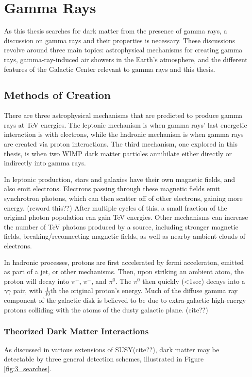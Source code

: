 \cleartooddpage[\thispagestyle{empty}]
\chapter{Gamma Rays}

As this thesis searches for dark matter from the presence of gamma rays, a discussion on gamma rays and their properties is necessary.
These discussions revolve around three main topics: astrophysical mechanisms for creating gamma rays, gamma-ray-induced air showers in the Earth's atmosphere, and the different features of the Galactic Center relevant to gamma rays and this thesis.


\section{Methods of Creation}

There are three astrophysical mechanisms that are predicted to produce gamma rays at TeV energies.
The leptonic mechanism is when gamma rays' last energetic interaction is with electrons, while the hadronic mechanism is when gamma rays are created via proton interactions.
The third mechanism, one explored in this thesis, is when two WIMP dark matter particles annihilate either directly or indirectly into gamma rays.

In leptonic production, stars and galaxies have their own magnetic fields, and also emit electrons.
Electrons passing through these magnetic fields emit synchrotron photons, which can then scatter off of other electrons, gaining more energy. {\color{red}(reword this??)}
After multiple cycles of this, a small fraction of the original photon population can gain TeV energies.
Other mechanisms can increase the number of TeV photons produced by a source, including stronger magnetic fields, breaking/reconnecting magnetic fields, as well as nearby ambient clouds of electrons.

In hadronic processes, protons are first accelerated by fermi acceleraton, emitted as part of a jet, or other mechanisms.
Then, upon striking an ambient atom, the proton will decay into $\pi^{+}$, $\pi^{-}$, and $\pi^{0}$.
The $\pi^{0}$ then quickly (<1sec) decays into a $\gamma\gamma$ pair, with \nicetilde $\frac{1}{10}$th the original proton's energy.
Much of the diffuse gamma ray component of the galactic disk is believed to be due to extra-galactic high-energy protons colliding with the atoms of the dusty galactic plane. {\color{red}(cite??)}


\subsection{Theorized Dark Matter Interactions}
As discussed in various extensions of SUSY{\color{red}(cite??)}, dark matter may be detectable by three general detection schemes, illustrated in Figure \ref{fig:3_searches}.

